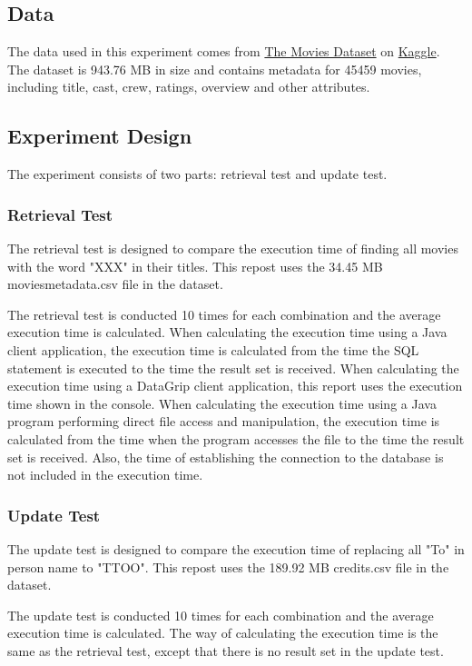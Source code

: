 \documentclass[a4paper,12pt]{article}
\begin{document}
\subsection{Data}
The data used in this experiment comes from \href{https://www.kaggle.com/datasets/rounakbanik/the-movies-dataset}{The Movies Dataset} on \href{https://www.kaggle.com/}{Kaggle}.
The dataset is 943.76 MB in size and contains metadata for 45459 movies, including title, cast, crew, ratings, overview and other attributes.

\subsection{Experiment Design}
The experiment consists of two parts: retrieval test and update test.

\subsubsection{Retrieval Test}
The retrieval test is designed to compare the execution time of finding all movies with the word "XXX" in their titles.
This repost uses the 34.45 MB movies\textunderscore metadata.csv file in the dataset.

The retrieval test is conducted 10 times for each combination and the average execution time is calculated.
When calculating the execution time using a Java client application, the execution time is calculated from the time the SQL statement is executed to the time the result set is received.
When calculating the execution time using a DataGrip client application, this report uses the execution time shown in the console.
When calculating the execution time using a Java program performing direct file access and manipulation, the execution time is calculated from the time when the program accesses the file to the time the result set is received.
Also, the time of establishing the connection to the database is not included in the execution time.

\subsubsection{Update Test}
The update test is designed to compare the execution time of replacing all "To" in person name to "TTOO".
This repost uses the 189.92 MB credits.csv file in the dataset.

The update test is conducted 10 times for each combination and the average execution time is calculated.
The way of calculating the execution time is the same as the retrieval test, except that there is no result set in the update test.
\end{document}
